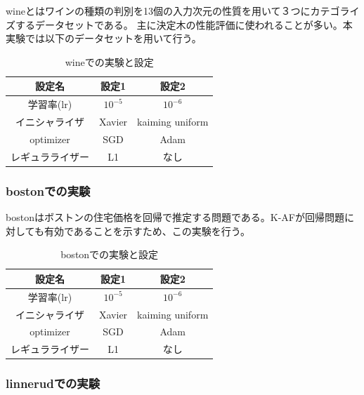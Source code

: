 wineとはワインの種類の判別を13個の入力次元の性質を用いて３つにカテゴライズするデータセットである。
主に決定木の性能評価に使われることが多い。本実験では以下のデータセットを用いて行う。

\begin{table}[htbp]
    \begin{center}
        \caption{wineでの実験と設定}
        \vspace{5mm} 
        \begin{tabular}{ |c|c|c| }
        設定名 & 設定1 & 設定2 \\
        \hline
        学習率(lr)         & $ 10^{-5} $ & $ 10^{-6} $ \\
        イニシャライザ       & Xavier & kaiming uniform \\
        optimizer           & SGD & Adam \\
        レギュラライザー     & L1 & なし \\
        \end{tabular}
    \end{center}
\end{table}


\subsubsection{bostonでの実験}

bostonはボストンの住宅価格を回帰で推定する問題である。K-AFが回帰問題に対しても有効であることを示すため、この実験を行う。

\begin{table}[htbp]
    \begin{center}
        \caption{bostonでの実験と設定}
        \vspace{5mm} 
        \begin{tabular}{ |c|c|c| }
        設定名 & 設定1 & 設定2 \\
        \hline
        学習率(lr)         & $ 10^{-5} $ & $ 10^{-6} $ \\
        イニシャライザ       & Xavier & kaiming uniform \\
        optimizer           & SGD & Adam \\
        レギュラライザー     & L1 & なし \\
        \end{tabular}
    \end{center}
\end{table}



\subsubsection{linnerudでの実験}


